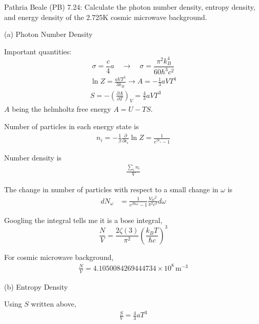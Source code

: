 \newpage
\begin{homeworkProblem}
    Pathria Beale (PB) 7.24: Calculate the photon number density, entropy density, and energy density of the 2.725K cosmic
    microwave background.

    \begin{callout}{(a) Photon Number Density}

        Important quantities:
        $$
        \sigma=\frac{c}{4} a \quad \rightarrow \quad \sigma=\frac{\pi^2 k_B^4}{60 \hbar^3 c^2}
        $$
        $$
        \begin{gathered}
            \ln Z=\frac{a V T^3}{3 k_B} \rightarrow A=-\frac{1}{3} a V T^4 \\
            S=-\left(\frac{\partial A}{\partial T}\right)_V=\frac{4}{3} a V T^3
        \end{gathered}
        $$
        $A$ being the helmholtz free energy $A=U-TS$.

        Number of particles in each energy state is
        \begin{align*}
            n_i = -\frac{1}{\beta} \frac{\partial}{\partial \epsilon_i} \ln Z = \frac{1}{e^{\beta \epsilon_i}-1}
        \end{align*}

        Number density is 
        \begin{align*}
            \frac{\sum_i n_i}{V}
        \end{align*}

        The change in number of particles with respect to a small change in $\omega$ is 
        \begin{align*}
            dN_{\omega} &= \frac{1}{e^{\beta\hbar \omega}-1} \frac{V \omega^{2}}{\pi^{2}c^{3}}d \omega
        \end{align*}

        Googling the integral tells me it is a bose integral,
        $$ \frac{N}{V}=\frac{2 \zeta(3)}{\pi^2}\left(\frac{k_B T}{\hbar c}\right)^3 $$

        For cosmic microwave background, 
        \begin{align*}
            \frac{N}{V} = 4.1050084269444734 \times \mathrm{10^{8}\, m^{-3}}
        \end{align*}

    \end{callout}
    \begin{callout}{(b) Entropy Density}

        Using $S$ written above, 
        \begin{align*}
            \frac{S}{V} = \frac{4}{3} a T^{3}
        \end{align*}


\end{callout}
\end{homeworkProblem}

